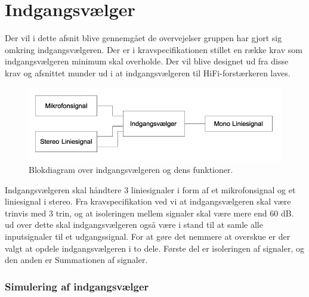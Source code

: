 \chapter{Indgangsvælger}
\label{indgangsvaelger}
Der vil i dette afsnit blive gennemgået de overvejelser gruppen har gjort sig omkring indgangsvælgeren. Der er i kravspecifikationen stillet en række krav som indgangsvælgeren minimum skal overholde. Der vil blive designet ud fra disse krav og afsnittet munder ud i at indgangsvælgeren til HiFi-forstærkeren laves.

\begin{figure}[h]
\centering
\includegraphics[scale=0.6]{implementering/indgangsvaelger/overordnetdesign.png}
\caption{Blokdiagram over indgangsvælgeren og dens funktioner.}
\label{indgangsvaelger-overordnet}
\end{figure}

Indgangsvælgeren skal håndtere 3 liniesignaler i form af et mikrofonsignal og et liniesignal i stereo. Fra kravspecifikation ved vi at indgangsvælgeren skal være trinvis med 3 trin, og at isoleringen mellem signaler skal være mere end 60 dB. ud over dette skal indgangsvælgeren også være i stand til at samle alle inputsignaler til et udgangssignal. For at gøre det nemmere at overskue er der valgt at opdele indgangsvælgeren i to dele. Første del er isoleringen af signaler, og den anden er Summationen af signaler.


\subsection*{Simulering af indgangsvælger}


